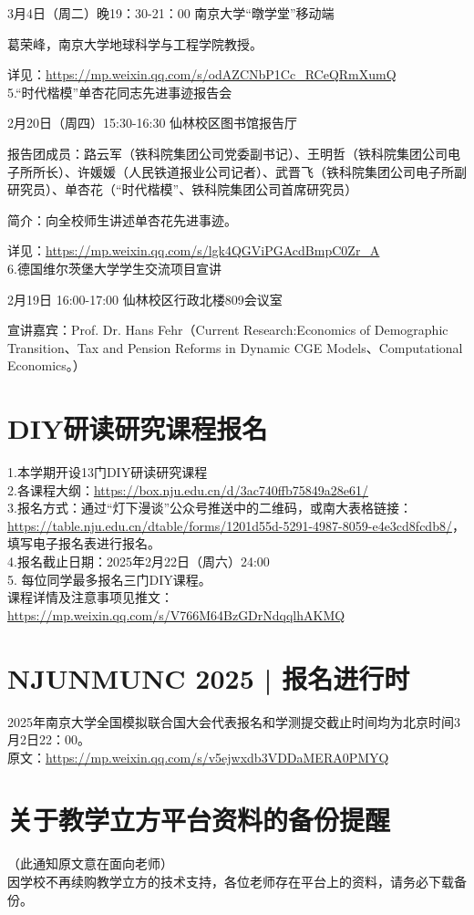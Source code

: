 \documentclass[letterpaper, 12pt]{article}
\begin{document}
\begin{multicols}{2}
3月4日（周二）晚19：30-21：00 南京大学“暾学堂”移动端

葛荣峰，南京大学地球科学与工程学院教授。

详见：\url{https://mp.weixin.qq.com/s/odAZCNbP1Cc_RCeQRmXumQ}\\

5.“时代楷模”单杏花同志先进事迹报告会

2月20日（周四）15:30-16:30  仙林校区图书馆报告厅 

报告团成员：路云军（铁科院集团公司党委副书记）、王明哲（铁科院集团公司电子所所长）、许媛媛（人民铁道报业公司记者）、武晋飞（铁科院集团公司电子所副研究员）、单杏花（“时代楷模”、铁科院集团公司首席研究员）

简介：向全校师生讲述单杏花先进事迹。

详见：\url{https://mp.weixin.qq.com/s/lgk4QGViPGAcdBmpC0Zr_A}\\

6.德国维尔茨堡大学学生交流项目宣讲

2月19日 16:00-17:00 仙林校区行政北楼809会议室

宣讲嘉宾：Prof. Dr. Hans Fehr（Current Research:Economics of Demographic Transition、Tax and Pension Reforms in Dynamic CGE Models、Computational Economics。）
\section{DIY研读研究课程报名}
1.本学期开设13门DIY研读研究课程\\
2.各课程大纲：\url{https://box.nju.edu.cn/d/3ac740ffb75849a28e61/}\\
3.报名方式：通过“灯下漫谈”公众号推送中的二维码，或南大表格链接：\url{https://table.nju.edu.cn/dtable/forms/1201d55d-5291-4987-8059-e4e3cd8fcdb8/}，填写电子报名表进行报名。\\
4.报名截止日期：2025年2月22日（周六）24:00\\
5. 每位同学最多报名三门DIY课程。\\
课程详情及注意事项见推文：\url{https://mp.weixin.qq.com/s/V766M64BzGDrNdqqlhAKMQ}

\section{NJUNMUNC 2025 | 报名进行时}
2025年南京大学全国模拟联合国大会代表报名和学测提交截止时间均为北京时间3月2日22：00。\\
原文：\url{https://mp.weixin.qq.com/s/v5ejwxdb3VDDaMERA0PMYQ}

\section{关于教学立方平台资料的备份提醒}
（此通知原文意在面向老师）\\
因学校不再续购教学立方的技术支持，各位老师存在平台上的资料，请务必下载备份。


\end{multicols}
\end{document}
